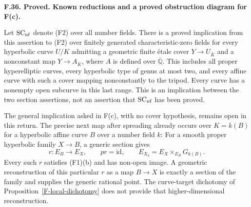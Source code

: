 \documentclass[11pt,oneside]{article}
\makeatletter
\newcounter{statementanchor}
\newenvironment{statement}[3]{%
 \refstepcounter{statementanchor}\def\@currentlabel{#1}%
 \par\addvspace{9pt}\noindent
 \textbf{#1. #2. #3.}\par\nobreak\noindent\ignorespaces
}{\par\addvspace{5pt}}
\makeatother
\begin{document}
\begin{statement}{F.36}{Proved}{Known reductions and a proved obstruction diagram for F(c)}
\label{st:F.36}
\label{F-field-reduction}
Let $\mathrm{SC}_{\rm nf}$ denote (F2) over all number fields.
There is a proved implication from this assertion to (F2)
over finitely generated characteristic-zero fields for every
hyperbolic curve $U/K$ admitting a geometric finite \'etale
cover $Y\to U_{\overline K}$ and a nonconstant map
$Y\to A_{\overline K}$, where $A$ is defined over
$\overline{\mathbb Q}$. This includes all proper hyperelliptic
curves, every hyperbolic type of genus at most two, and every
affine curve with such a cover mapping nonconstantly to the
tripod. Every curve has a nonempty open subcurve in this last
range. This is an implication between the two section
assertions, not an assertion that $\mathrm{SC}_{\rm nf}$ has
been proved.

The general implication asked in F(c), with no cover
hypothesis, remains open in this return. The precise next
map after spreading already occurs over $K=k(B)$ for a
hyperbolic affine curve $B$ over a number field $k$:
For a smooth proper hyperbolic family
$X\to B$, a generic section gives
\[
 r:E_B\longrightarrow E_X,
 \qquad p r=\mathrm{id},
 \qquad E_{X_\eta}=E_X\times_{E_B}G_{k(B)}.
\]
Every such $r$ satisfies (F1)(b) and has non-open image. A
geometric reconstruction of this particular $r$ as a map
$B\to X$ is exactly a section of the family and supplies the
generic rational point. The curve-target dichotomy of
Proposition~\ref{F-local-dichotomy} does not provide that
higher-dimensional reconstruction.
\end{statement}
\end{document}
